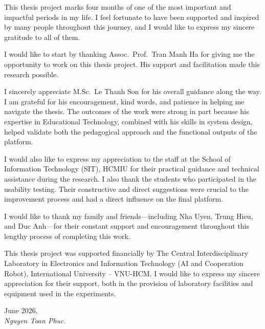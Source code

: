 This thesis project marks four months of one of the most important and impactful periods in
my life. I feel fortunate to have been supported and inspired by many people throughout this
journey, and I would like to express my sincere gratitude to all of them.

I would like to start by thanking Assoc.\ Prof.\ Tran Manh Ha for giving me the opportunity
to work on this thesis project. His support and facilitation made this research possible.

I sincerely appreciate M.Sc.\ Le Thanh Son for his overall guidance along the way. I am
grateful for his encouragement, kind words, and patience in helping me navigate the thesis.
The outcomes of the work were strong in part because his expertise in Educational Technology,
combined with his skills in system design, helped validate both the pedagogical approach and
the functional outputs of the platform.

I would also like to express my appreciation to the staff at the School of Information
Technology (SIT), HCMIU for their practical guidance and technical assistance during the
research. I also thank the students who participated in the usability testing. Their
constructive and direct suggestions were crucial to the improvement process and had a direct
influence on the final platform.

I would like to thank my family and friends---including Nha Uyen, Trung Hieu, and Duc
Anh---for their constant support and encouragement throughout this lengthy process of
completing this work.

This thesis project was supported financially by The Central Interdisciplinary Laboratory in
Electronics and Information Technology (AI and Cooperation Robot), International University
-- VNU-HCM. I would like to express my sincere appreciation for their support, both in the
provision of laboratory facilities and equipment used in the experiments.

\bigskip
\noindent
June 2026, \\
\textit{Nguyen Toan Phuc.}
